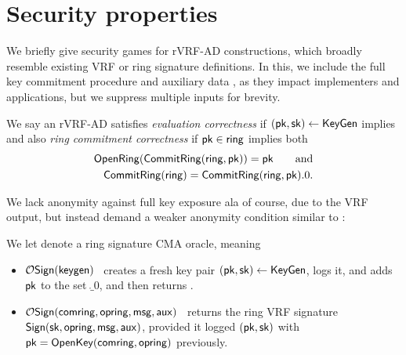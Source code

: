 
\section{Security properties}
\label{sec:rvrf_games}

We briefly give security games for rVRF-AD constructions, which broadly
resemble existing VRF or ring signature definitions.  In this, we include
the full key commitment procedure and auxiliary data \aux, as they impact
implementers and applications, but we suppress multiple inputs for brevity.


\begin{definition}
We say an rVRF-AD satisfies {\em evaluation correctness} if
$(\mathsf{pk},\mathsf{sk}) \leftarrow {\ensuremath{\mathsf{KeyGen}}}$ implies
\def\tmpC{\Eval(\sk,\msg) = \Verify(\pk,\msg,\aux,\Sign(\sk,\msg,\aux))}
\eprint{$\tmpC$, succeeds}{$$ \tmpC, $$}
and also {\em ring commitment correctness} if
$\mathsf{pk} \in \mathsf{ring}$ implies both
\def\tmpA{\OpenRing(\CommitRing(\ring,\pk)) = \pk}
\def\tmpB{\CommitRing(\ring) = \CommitRing(\ring,\pk).0} 
\eprint{$$ \tmpA \quad\textrm{and}\quad \tmpB \mathperiod $$}%
{$$ \begin{aligned}
   \tmpA \qquad\textrm{and} \\
   \tmpB \mathperiod
\end{aligned} $$}
\end{definition}

We lack anonymity against full key exposure ala
 \cite[pp. 6 Def. 4]{cryptoeprint:2005:304} of course, due to the VRF output,
but instead demand a weaker anonymity condition similar to
 \cite[pp. 5 Def. 3]{cryptoeprint:2005:304}:

\begin{definition}\label{def:rvrf_sign_oracle}
We let  denote a ring signature CMA oracle, meaning
\begin{itemize}
\item $\mathcal{O}\mathsf{Sign}(\mathsf{keygen})$ \, 
 creates a fresh key pair $(\mathsf{pk},\mathsf{sk}) \leftarrow {\ensuremath{\mathsf{KeyGen}}}$, logs it, and
 adds $\mathsf{pk}$ to the set $\ring_0$, and then returns \pk.
\item $\mathcal{O}\mathsf{Sign}(\mathsf{comring},\mathsf{opring},\mathsf{msg},\mathsf{aux})$ \,
 returns the ring VRF signature ${\mathsf{Sign}}(\mathsf{sk},\mathsf{opring},\mathsf{msg},\mathsf{aux})$,
 provided it logged $(\mathsf{pk},\mathsf{sk})$ with $\mathsf{pk} = {\mathsf{OpenKey}}(\mathsf{comring},\mathsf{opring})$ previously.
\end{itemize}
\end{definition}

